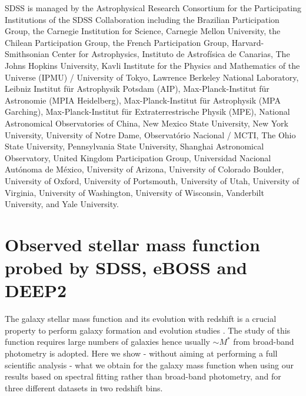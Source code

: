 \documentclass[onecolumn]{aa}
\begin{document}
SDSS is managed by the Astrophysical Research Consortium for the Participating Institutions of the SDSS Collaboration including the Brazilian Participation Group, the Carnegie Institution for Science, Carnegie Mellon University, the Chilean Participation Group, the French Participation Group, Harvard-Smithsonian Center for Astrophysics, Instituto de Astrof\'{i}sica de Canarias, The Johns Hopkins University, Kavli Institute for the Physics and Mathematics of the Universe (IPMU) / University of Tokyo, Lawrence Berkeley National Laboratory, Leibniz Institut für Astrophysik Potsdam (AIP), Max-Planck-Institut für Astronomie (MPIA Heidelberg), Max-Planck-Institut für Astrophysik (MPA Garching), Max-Planck-Institut für Extraterrestrische Physik (MPE), National Astronomical Observatories of China, New Mexico State University, New York University, University of Notre Dame, Observatório Nacional / MCTI, The Ohio State University, Pennsylvania State University, Shanghai Astronomical Observatory, United Kingdom Participation Group, Universidad Nacional Autónoma de México, University of Arizona, University of Colorado Boulder, University of Oxford, University of Portsmouth, University of Utah, University of Virginia, University of Washington, University of Wisconsin, Vanderbilt University, and Yale University.




\appendix


\section{Observed stellar mass function probed by SDSS, eBOSS and DEEP2}
\label{subsec:sdss:stellarmassdensity}

The galaxy stellar mass function and its evolution with redshift is a crucial property to perform galaxy formation and evolution studies \citep{2006ApJ...651..120B,2010A&A...523A..13P,Maraston2013,Ilbert2013SMF,2016MNRAS.455.4122B,2017MNRAS.466..228E}. 
The study of this function requires large numbers of galaxies hence usually $\sim M^{*}$ from broad-band photometry is adopted. 
Here we show - without aiming at performing a full scientific analysis - what we obtain for the galaxy mass function when using our results based on spectral fitting rather than broad-band photometry, and for three different datasets in two redshift bins.
\end{document}
